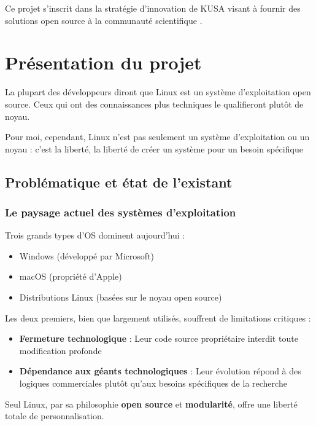 Ce projet s'inscrit dans la stratégie d'innovation de KUSA visant à fournir des solutions open source à la communauté scientifique .
\clearpage
\section{Présentation du projet}

La plupart des développeurs diront que Linux est un système d’exploitation open source. Ceux qui ont des connaissances plus techniques le qualifieront plutôt de noyau.

Pour moi, cependant, Linux n’est pas seulement un système d’exploitation ou un noyau : c’est la liberté, la liberté de créer un système pour un besoin spécifique


\subsection{Problématique et état de l'existant}

\subsubsection{Le paysage actuel des systèmes d'exploitation}
Trois grands types d'OS dominent aujourd'hui :
\begin{itemize}[leftmargin=*,nosep]
\item Windows (développé par Microsoft)
\item macOS (propriété d'Apple)
\item Distributions Linux (basées sur le noyau open source)
\end{itemize}

Les deux premiers, bien que largement utilisés, souffrent de limitations critiques :
\begin{itemize}[leftmargin=*,nosep]
\item \textbf{Fermeture technologique} : Leur code source propriétaire interdit toute modification profonde
\item \textbf{Dépendance aux géants technologiques} : Leur évolution répond à des logiques commerciales plutôt qu'aux besoins spécifiques de la recherche
\end{itemize}

Seul Linux, par sa philosophie  \textbf{open source} et  \textbf{modularité}, offre une liberté totale de personnalisation.

